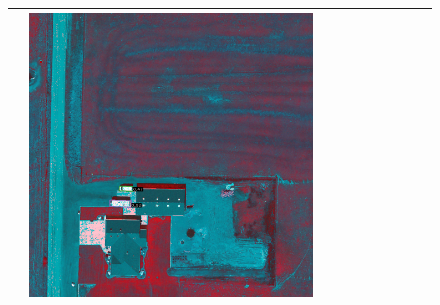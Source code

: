 \begin{figure}[H]
\begin{tabularx}{\textwidth}{c|*{9}{X}}
    & \includegraphics[trim={300pt 355pt 610pt 570pt},clip,width=\linewidth]{images/015Results/02perm_exp/comp_images/gbndvi/198.png} \\ \hline


\end{tabularx}
\end{figure}
